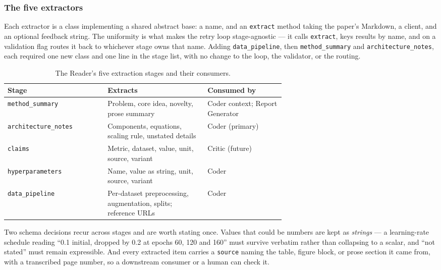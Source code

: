 \documentclass[11pt]{article}
\begin{document}
\subsubsection{The five extractors}

Each extractor is a class implementing a shared abstract base: a name, and an
\texttt{extract} method taking the paper's Markdown, a client, and an optional feedback
string. The uniformity is what makes the retry loop stage-agnostic --- it calls
\texttt{extract}, keys results by name, and on a validation flag routes it back to
whichever stage owns that name. Adding \texttt{data\_pipeline}, then
\texttt{method\_summary} and \texttt{architecture\_notes}, each required one new class and
one line in the stage list, with no change to the loop, the validator, or the routing.

\begin{table}[htbp]
\centering
\small
\caption{The Reader's five extraction stages and their consumers.}
\label{tab:extractors}
\begin{tabular}{lp{0.36\linewidth}p{0.28\linewidth}}
\toprule
Stage & Extracts & Consumed by \\
\midrule
\texttt{method\_summary}     & Problem, core idea, novelty, prose summary & Coder context;
                                                                            Report Generator \\
\texttt{architecture\_notes} & Components, equations, scaling rule, unstated details &
                                                                            Coder (primary) \\
\texttt{claims}              & Metric, dataset, value, unit, source, variant & Critic
                                                                            (future) \\
\texttt{hyperparameters}     & Name, value as string, unit, source, variant & Coder \\
\texttt{data\_pipeline}      & Per-dataset preprocessing, augmentation, splits; reference
                               URLs & Coder \\
\bottomrule
\end{tabular}
\end{table}

Two schema decisions recur across stages and are worth stating once. Values that could be
numbers are kept as \emph{strings} --- a learning-rate schedule reading ``0.1 initial,
dropped by 0.2 at epochs 60, 120 and 160'' must survive verbatim rather than collapsing to
a scalar, and ``not stated'' must remain expressible. And every extracted item carries a
\texttt{source} naming the table, figure block, or prose section it came from, with a
transcribed page number, so a downstream consumer or a human can check it.
\end{document}

